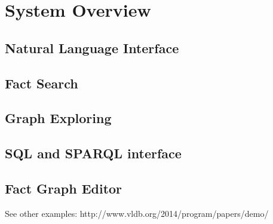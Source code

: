 
\section{System Overview}

\subsection{Natural Language Interface}

\subsection{Fact Search}

\subsection{Graph Exploring}

\subsection{SQL and SPARQL interface}

\subsection{Fact Graph Editor}

See other examples: http://www.vldb.org/2014/program/papers/demo/

